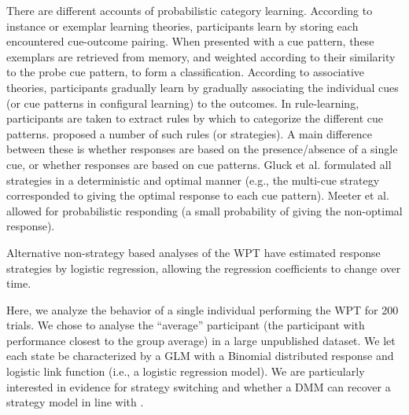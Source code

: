 \documentclass[a4paper,12pt,man]{apa} %
\begin{document}
\nocite{Knowlton1994}


There are different accounts of probabilistic category learning.
According to instance or exemplar learning theories, participants
learn by storing each encountered cue-outcome pairing.  When presented
with a cue pattern, these exemplars are retrieved from memory, and
weighted according to their similarity to the probe cue pattern, to
form a classification.  According to associative theories,
participants gradually learn by gradually associating the individual
cues (or cue patterns in configural learning) to the outcomes.  In
rule-learning, participants are taken to extract rules by which to
categorize the different cue patterns.  \cite{Gluck2002} proposed a
number of such rules (or strategies).  A main difference between these
is whether responses are based on the presence/absence of a single
cue, or whether responses are based on cue patterns.  Gluck et al.
formulated all strategies in a deterministic and optimal manner (e.g.,
the multi-cue strategy corresponded to giving the optimal response to
each cue pattern).  Meeter et al.  allowed for probabilistic
responding (a small probability of giving the non-optimal response).

Alternative non-strategy based analyses of the WPT
\cite{Lagnado??,Speekenbrink??} have estimated response strategies by
logistic regression, allowing the regression coefficients to change
over time.

Here, we analyze the behavior of a single individual performing the
WPT for 200 trials.  We chose to analyse the ``average'' participant
(the participant with performance closest to the group average) in a
large unpublished dataset.  We let each state be characterized by a
GLM with a Binomial distributed response and logistic link function
(i.e., a logistic regression model).  We are particularly interested
in evidence for strategy switching and whether a DMM can recover a
strategy model in line with \cite{Gluck2002}.
\end{document}
